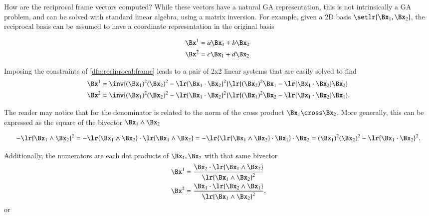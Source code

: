 %
%
How are the reciprocal frame vectors computed?  While these vectors have a natural GA representation, this is not intrinsically a GA problem, and can be solved with standard linear algebra, using a matrix inversion.
For example, given a 2D basis \( \setlr{ \Bx_1, \Bx_2 } \), the reciprocal basis can be assumed to have a coordinate representation in the original basis

\begin{dmath}\label{eqn:reciprocal_R2:100}
\begin{aligned}
\Bx^1 &= a \Bx_1 + b \Bx_2 \\
\Bx^2 &= c \Bx_1 + d \Bx_2.
\end{aligned}
\end{dmath}

Imposing the constraints of \cref{dfn:reciprocal:frame} leads to a pair of 2x2 linear systems that are easily solved to find
\begin{dmath}\label{eqn:reciprocal_R2:120}
\begin{aligned}
\Bx^1 &= \inv{ (\Bx_1)^2 (\Bx_2)^2 - \lr{ \Bx_1 \cdot \Bx_2}^2 } \lr{ (\Bx_2)^2 \Bx_1 - \lr{ \Bx_1 \cdot \Bx_2 } \Bx_2 } \\
\Bx^2 &= \inv{ (\Bx_1)^2 (\Bx_2)^2 - \lr{ \Bx_1 \cdot \Bx_2}^2 } \lr{ (\Bx_1)^2 \Bx_2 - \lr{ \Bx_1 \cdot \Bx_2 } \Bx_1 }.
\end{aligned}
\end{dmath}

The reader may notice that for  the denominator is related to the norm of the cross product \( \Bx_1 \cross \Bx_2 \).
More generally, this can be expressed as the square of the bivector \( \Bx_1 \wedge \Bx_2 \)

\begin{dmath}\label{eqn:reciprocal_R2:140}
-\lr{\Bx_1 \wedge \Bx_2 }^2
=
-\lr{\Bx_1 \wedge \Bx_2 } \cdot \lr{\Bx_1 \wedge \Bx_2 }
=
-\lr{ \lr{\Bx_1 \wedge \Bx_2 } \cdot \Bx_1 } \cdot \Bx_2
=
(\Bx_1)^2 (\Bx_2)^2 - \lr{\Bx_1 \cdot \Bx_2}^2.
\end{dmath}

Additionally, the numerators are each dot products of \( \Bx_1, \Bx_2 \) with that same bivector
\begin{dmath}\label{eqn:reciprocal_R2:160}
\begin{aligned}
\Bx^1 &= \frac{\Bx_2 \cdot \lr{ \Bx_1 \wedge \Bx_2 } }{ \lr{ \Bx_1 \wedge \Bx_2}^2 } \\
\Bx^2 &= \frac{\Bx_1 \cdot \lr{ \Bx_2 \wedge \Bx_1 } }{ \lr{ \Bx_1 \wedge \Bx_2}^2 },
\end{aligned}
\end{dmath}
or

